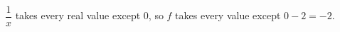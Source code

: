 $\dfrac{1}{x}$ takes every real value except $0$, so $f$ takes every value except $0-2=\boxed{-2}$.
